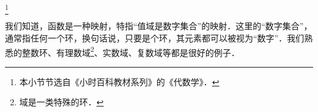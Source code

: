 
\footnote{本小节节选自《小时百科教材系列》的《代数学》．}

我们知道，函数是一种映射，特指“值域是数字集合”的映射．这里的“数字集合”，通常指任何一个环，换句话说，只要是个环，其元素都可以被视为“数字”．我们熟悉的整数环、有理数域\footnote{域是一类特殊的环．}、实数域、复数域等都是很好的例子．

























